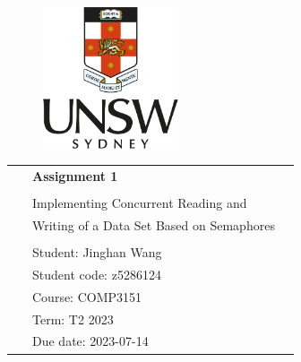 \begin{center}

\vspace*{4cm}

\begin{figure}
  \raggedleft
  \begin{minipage}{4cm}
  \includegraphics[width=4cm]{new-UNSW-logo-png-vertical-crest}
  \end{minipage}
\end{figure}

\vspace*{4cm}

\vspace*{0.1in}

\begin{spacing}{1.7}

\begin{tabular}{p{4cm} ll}

& \textbf{\absfont\huge Assignment 1}\\ %
& \\
& \large Implementing Concurrent Reading and \\
& \large Writing of a Data Set Based on Semaphores \\ 

& \\
& \large Student: Jinghan Wang \\
& \large Student code: z5286124\\
& \large Course: COMP3151\\
& \large Term: T2 2023 \\\
& \large Due date: 2023-07-14
\end{tabular}

\end{spacing}

\end{center}



\thispagestyle{empty} %
\clearpage\setcounter{page}{1} %
\pagenumbering{roman} %